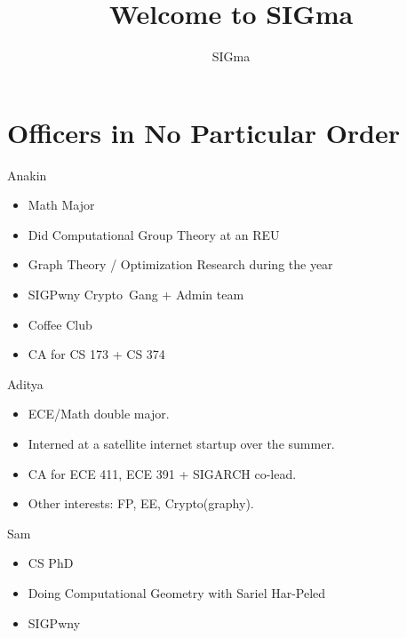 \documentclass[aspectratio=169]{beamer}
\title{Welcome to SIGma}
\subtitle{\cite{zeck, robust}}
\author{SIGma}
\date{}
\begin{document}

\begin{frame}
\titlepage
\end{frame}


\section{Officers in No Particular Order}
\frame{\sectionpage}

\begin{frame}{Anakin} 
        \begin{itemize}
        \item Math Major
        \item Did Computational Group Theory at an REU
        \item Graph Theory / Optimization Research during the year
        \item SIGPwny Crypto\footnotemark\ Gang + Admin team
        \item Coffee Club
        \item CA for CS 173 + CS 374
    \end{itemize}
\end{frame}

\begin{frame}{Aditya}
    \begin{itemize}
        \item ECE/Math double major.
        \item Interned at a satellite internet startup over the summer.
        \item CA for ECE 411, ECE 391 + SIGARCH co-lead.
        \item Other interests: FP, EE, Crypto(graphy).
    \end{itemize} 
\end{frame}

\begin{frame}{Sam}
    \begin{itemize}
    \item CS PhD
    \item Doing Computational Geometry with Sariel Har-Peled
    \item SIGPwny
    \end{itemize}
\end{frame}
\end{document}
